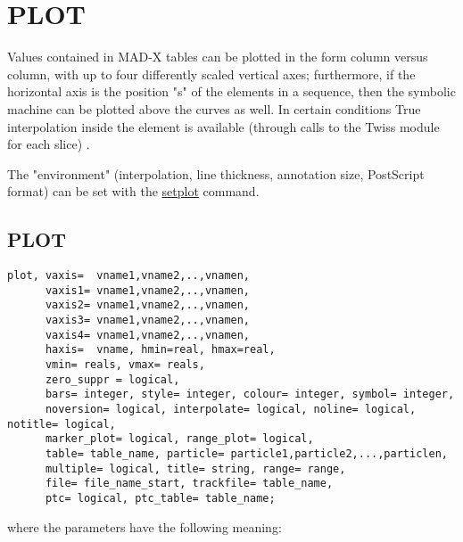 
\chapter{PLOT}

Values contained in MAD-X tables can be plotted in the form column
versus column, with up to four differently scaled vertical axes;
furthermore, if the horizontal axis is the position "s" of the elements
in a sequence, then the symbolic machine can be plotted above the curves
as well. In certain conditions True interpolation inside the element is
available (through calls to the Twiss module for each slice) .  

The "environment" (interpolation, line thickness, annotation size,
PostScript format) can be set with the \hyperlink{setplot}{setplot}
command.   


\section{PLOT}	
\begin{verbatim}
plot, vaxis=  vname1,vname2,..,vnamen,
      vaxis1= vname1,vname2,..,vnamen, 
      vaxis2= vname1,vname2,..,vnamen,
      vaxis3= vname1,vname2,..,vnamen, 
      vaxis4= vname1,vname2,..,vnamen,
      haxis=  vname, hmin=real, hmax=real, 
      vmin= reals, vmax= reals, 
      zero_suppr = logical,
      bars= integer, style= integer, colour= integer, symbol= integer, 
      noversion= logical, interpolate= logical, noline= logical, notitle= logical, 
      marker_plot= logical, range_plot= logical, 
      table= table_name, particle= particle1,particle2,...,particlen,
      multiple= logical, title= string, range= range, 
      file= file_name_start, trackfile= table_name,
      ptc= logical, ptc_table= table_name; 
\end{verbatim} 

where the parameters have the following meaning: 

